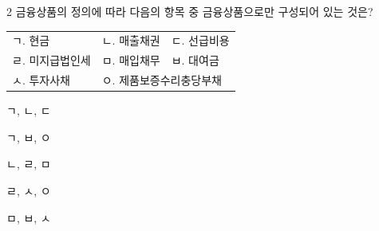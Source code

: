 \begin{question}{2}
금융상품의 정의에 따라 다음의 항목 중 금융상품으로만 구성되어 있는 것은?
\begin{framedtext}
\begin{tabular}{@{}lll@{}}
ㄱ. 현금 & ㄴ. 매출채권 & ㄷ. 선급비용 \\
ㄹ. 미지급법인세 & ㅁ. 매입채무 & ㅂ. 대여금 \\
ㅅ. 투자사채 & \multicolumn{2}{l}{ㅇ. 제품보증수리충당부채}
\end{tabular}
\end{framedtext}
\begin{choices}
  \item ㄱ, ㄴ, ㄷ
  \item ㄱ, ㅂ, ㅇ
  \item ㄴ, ㄹ, ㅁ
  \item ㄹ, ㅅ, ㅇ
  \item ㅁ, ㅂ, ㅅ
\end{choices}
\end{question}
